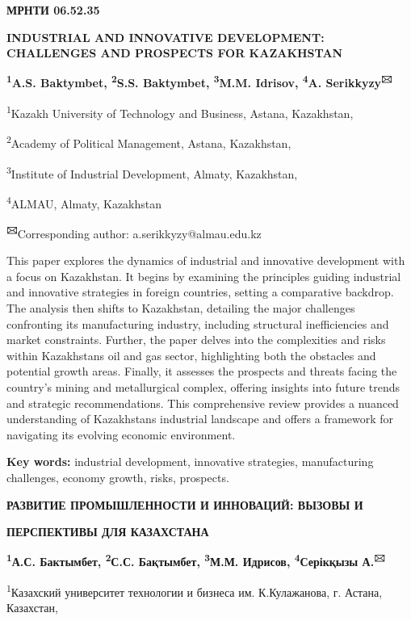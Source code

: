 
\newpage
{\bfseries МРНТИ 06.52.35}

{\bfseries INDUSTRIAL AND INNOVATIVE DEVELOPMENT: CHALLENGES AND PROSPECTS
FOR KAZAKHSTAN}

{\bfseries \textsuperscript{1}A.S. Baktymbet, \textsuperscript{2}S.S.
Baktymbet, \textsuperscript{3}M.M. Idrisov, \textsuperscript{4}A.
Serikkyzy\textsuperscript{🖂}}

\textsuperscript{1}Kazakh University of Technology and Business, Astana,
Kazakhstan,

\textsuperscript{2}Academy of Political Management, Astana, Kazakhstan,

\textsuperscript{3}Institute of Industrial Development, Almaty,
Kazakhstan,

\textsuperscript{4}ALMAU, Almaty, Kazakhstan

{\bfseries \textsuperscript{🖂}}Corresponding author:
a.serikkyzy@almau.edu.kz

This paper explores the dynamics of industrial and innovative
development with a focus on Kazakhstan. It begins by examining the
principles guiding industrial and innovative strategies in foreign
countries, setting a comparative backdrop. The analysis then shifts to
Kazakhstan, detailing the major challenges confronting its manufacturing
industry, including structural inefficiencies and market constraints.
Further, the paper delves into the complexities and risks within
Kazakhstan\textquotesingle s oil and gas sector, highlighting both the
obstacles and potential growth areas. Finally, it assesses the prospects
and threats facing the country's mining and metallurgical complex,
offering insights into future trends and strategic recommendations. This
comprehensive review provides a nuanced understanding of
Kazakhstan\textquotesingle s industrial landscape and offers a framework
for navigating its evolving economic environment.

{\bfseries Key words:} industrial development, innovative strategies,
manufacturing challenges, economy growth, risks, prospects.

{\bfseries РАЗВИТИЕ ПРОМЫШЛЕННОСТИ И ИННОВАЦИЙ: ВЫЗОВЫ И}

{\bfseries ПЕРСПЕКТИВЫ ДЛЯ КАЗАХСТАНА}

{\bfseries \textsuperscript{1}А.С. Бактымбет, \textsuperscript{2}С.С.
Бақтымбет, \textsuperscript{3}М.М. Идрисов, \textsuperscript{4}Серікқызы
А.\textsuperscript{🖂}}

\textsuperscript{1}Казахский университет технологии и бизнеса им.
К.Кулажанова, г. Астана, Казахстан,

